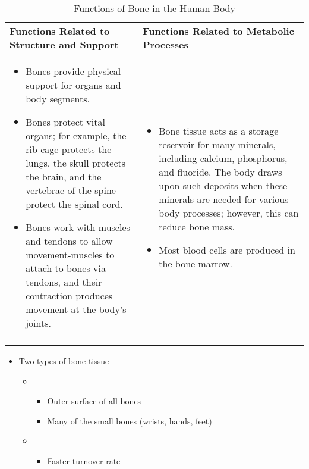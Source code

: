 \documentclass[title={Chapter 9}]{fdsn201notes}
\begin{document}
\begin{table}[H]
	\centering
	\caption{Functions of Bone in the Human Body}
	\label{tab:functions-of-bone}
	\begin{tabular}{p{}p{}}
		\rowcolor{rowdarkgreen}\textbf{Functions Related to Structure and Support} & \textbf{Functions Related to Metabolic Processes}\\
		\begin{itemize}
			\item Bones provide physical support for organs and body segments.
			\item Bones protect vital organs; for example, the rib cage protects the lungs, the skull protects the brain, and the vertebrae of the spine protect the spinal cord.
			\item Bones work with muscles and tendons to allow movement-muscles to attach to bones via tendons, and their contraction produces movement at the body's joints.
		\end{itemize} & \begin{itemize}
			\item Bone tissue acts as a storage reservoir for many minerals, including calcium, phosphorus, and fluoride. The body draws upon such deposits when these minerals are needed for various body processes; however, this can reduce bone mass.
			\item Most blood cells are produced in the bone marrow.
		\end{itemize}\\
		\rowcolor{rowdarkgreen} & \\
	\end{tabular}
\end{table}

\begin{itemize}
	\item Two types of bone tissue
	\begin{itemize}
		\item {}
		\begin{itemize}
			\item Outer surface of all bones
			\item Many of the small bones (wrists, hands, feet)
		\end{itemize}
		\item {}
		\begin{itemize}
			\item Faster turnover rate
		\end{itemize}
	\end{itemize}
\end{itemize}
\end{document}
